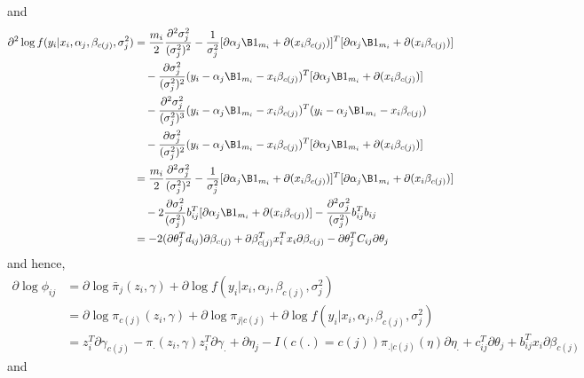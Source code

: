 and
\begin{align*}
\partial^{2} \log f(y_{i}|x_{i},\alpha_{j},\beta_{c(j)},\sigma^{2}_{j}) &= \frac{m_{i}}{2}\frac{\partial^{2}\sigma_{j}^{2}}{(\sigma_{j}^{2})^{2}}-\frac{1}{\sigma_{j}^{2}}[\partial \alpha_{j}\B 1_{m_i}+\partial(x_{i}\beta_{c(j)})]^{T}[\partial \alpha_{j}\B 1_{m_i}+\partial(x_{i}\beta_{c(j)})]\\
&\quad-\frac{\partial \sigma_{j}^{2}}{(\sigma^{2}_{j})^{2}}(y_{i}-\alpha_{j}\B 1_{m_i}-x_{i}\beta_{c(j)})^{T}[\partial \alpha_{j}\B 1_{m_i}+\partial(x_{i}\beta_{c(j)})]\\
&\quad-\frac{\partial^{2}\sigma_{j}^{2}}{(\sigma_{j}^{2})^{3}}(y_{i}-\alpha_{j}\B 1_{m_i}-x_{i}\beta_{c(j)})^{T}(y_{i}-\alpha_{j}\B 1_{m_i}-x_{i}\beta_{c(j)})\\
&\quad-\frac{\partial\sigma_{j}^{2}}{(\sigma_{j}^{2})^{2}}(y_{i}-\alpha_{j}\B 1_{m_i}-x_{i}\beta_{c(j)})^{T}[\partial \alpha_{j}\B 1_{m_i}+\partial(x_{i}\beta_{c(j)})]\\
&= \frac{m_{i}}{2}\frac{\partial^{2}\sigma_{j}^{2}}{(\sigma_{j}^{2})^{2}}-\frac{1}{\sigma_{j}^{2}}[\partial \alpha_{j}\B 1_{m_i}+\partial(x_{i}\beta_{c(j)})]^{T}[\partial\alpha_{j}\B 1_{m_i}+\partial(x_{i}\beta_{c(j)})]\\
&\quad-2\frac{\partial \sigma_{j}^{2}}{(\sigma^{2}_{j})}b_{ij}^{T}[\partial\alpha_{j}\B 1_{m_i}+\partial(x_{i}\beta_{c(j)})]-\frac{\partial^{2}\sigma_{j}^{2}}{(\sigma_{j}^{2})}b_{ij}^{T}b_{ij}\\
&= -2(\partial \theta_{j}^{T}d_{ij})\partial\beta_{c(j)}+\partial\beta_{c(j)}^{T}x_{i}^{T}x_{i}\partial\beta_{c(j)}-\partial \theta_{j}^{T}C_{ij}\partial \theta_{j}\\
\end{align*}
and hence,
\begin{align}\label{dphi}
\partial \log \phi_{ij} &= \partial \log \bar{\pi}_{j}(z_{i},\gamma)+\partial \log f(y_{i}|x_{i},\alpha_{j},\beta_{c(j)},\sigma^{2}_{j})\nonumber\\
&= \partial \log \pi_{c(j)}(z_{i},\gamma)+\partial \log \pi_{j|c(j)}+\partial \log f(y_{i}|x_{i},\alpha_{j},\beta_{c(j)},\sigma^{2}_{j})\nonumber\\
&= z_{i}^{T}\partial \gamma_{c(j)}-\pi_{.}(z_{i},\gamma)z_{i}^{T}\partial \gamma_{.}+ \partial \eta_{j} - I(c(.)=c(j))\pi_{.|c(j)}(\eta)\partial \eta_{.}+c_{ij}^{T}\partial\theta_{j}+b_{ij}^{T}x_{i}\partial \beta_{c(j)}
\end{align}
and
